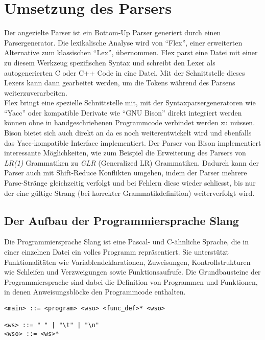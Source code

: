 \chapter{Umsetzung des Parsers}
\label{chap:building:parser}

Der angezielte Parser ist ein Bottom-Up Parser generiert durch einen Parsergenerator.
Die lexikalische Analyse wird von ``Flex'', einer erweiterten Alternative zum klassischen ``Lex'', übernommen.
Flex parst eine Datei mit einer zu diesem Werkzeug spezifischen Syntax und schreibt den Lexer als autogenerierten C oder C++ Code in eine Datei.
Mit der Schnittstelle dieses Lexers kann dann gearbeitet werden, um die Tokens während des Parsens weiterzuverarbeiten.\\
Flex bringt eine spezielle Schnittstelle mit, mit der Syntaxparsergeneratoren wie ``Yacc'' oder kompatible Derivate wie ``GNU Bison'' direkt integriert werden können ohne in handgeschriebenen Programmcode verbindet werden zu müssen\cite{flex:1995}.\\
Bison bietet sich auch direkt an da es noch weiterentwickelt wird und ebenfalls das Yacc-kompatible Interface implementiert.
Der Parser von Bison implementiert interessante Möglichkeiten, wie zum Beispiel die Erweiterung des Parsers von \textit{LR(1)} Grammatiken zu \textit{GLR} (Generalized LR) Grammatiken.
Dadurch kann der Parser auch mit Shift-Reduce Konflikten umgehen, indem der Parser mehrere Parse-Stränge gleichzeitig verfolgt und bei Fehlern diese wieder schliesst, bis nur der eine gültige Strang (bei korrekter Grammatikdefinition) weiterverfolgt wird\cite{bisonmanual}.\\

\section{Der Aufbau der Programmiersprache Slang}

Die Programmiersprache Slang ist eine Pascal- und C-ähnliche Sprache, die in einer einzelnen Datei ein volles Programm repräsentiert.
Sie unterstützt Funktionalitäten wie Variablendeklarationen, Zuweisungen, Kontrollstrukturen wie Schleifen und Verzweigungen sowie Funktionsaufrufe.
Die Grundbausteine der Programmiersprache sind dabei die Definition von Programmen und Funktionen, in denen Anweisungsblöcke den Programmcode enthalten.\\

\begin{lstlisting}
<main> ::= <program> <wso> <func_def>* <wso>

<ws> ::= " " | "\t" | "\n"
<wso> ::= <ws>*
\end{lstlisting}

